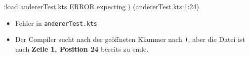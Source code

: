 \begin{frame}[fragile]
    \slidehead
    \pause
    \begin{commandshell}[][minted language=text]
        [0] :load andererTest.kts
        ERROR expecting ) (andererTest.kts:1:24)
    \end{commandshell}
    \pause
    \begin{itemize}[<+->]
        \item Fehler in \texttt{andererTest.kts}
        \item Der Compiler sucht nach der geöffneten Klammer nach \texttt{)}, aber die Datei ist nach \textbf{Zeile 1, Position 24} bereits zu ende.
    \end{itemize}
\end{frame}

\subsection{}
\livecoding




